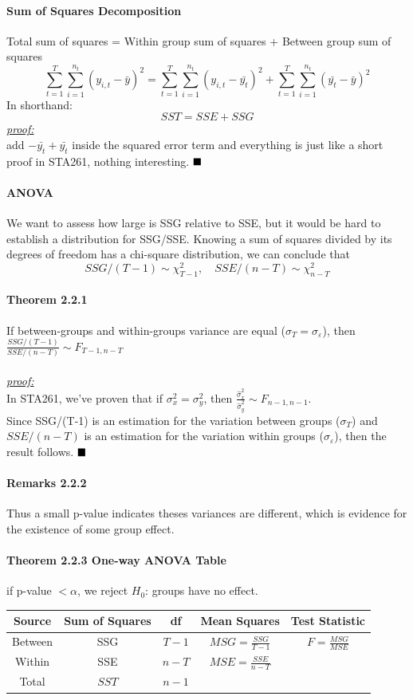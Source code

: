 \documentclass[11pt]{article}
\newcommand{\proof}[0]{\textit{\underline{proof:} }}
\newcommand{\qed}[0]{$\hfill\blacksquare$}
\begin{document}
\paragraph{Sum of Squares Decomposition}
Total sum of squares = Within group sum of squares + Between group sum of squares \\
$$\sum_{t=1}^T\sum_{i=1}^{n_t}(y_{i,t}-\bar{y})^2 = \sum_{t=1}^T\sum_{i=1}^{n_t}(y_{i,t}-\bar{y_t})^2 + \sum_{t=1}^T\sum_{i=1}^{n_t}(\bar{y_t}-\bar{y})^2$$
In shorthand:
$$SST = SSE + SSG$$
\proof\\
add $-\bar{y_t}+\bar{y_t}$ inside the squared error term and everything is just like a short proof in STA261, nothing interesting. \qed
\paragraph{ANOVA}
We want to assess how large is SSG relative to SSE, but it would be hard to establish a distribution for SSG/SSE. Knowing a sum of squares divided by its degrees of freedom has a chi-square distribution, we can conclude that
$$SSG/(T-1) \sim \chi_{T-1}^2, \quad SSE/(n-T) \sim \chi_{n-T}^2$$
\paragraph{Theorem 2.2.1} If between-groups and within-groups variance are equal ($\sigma_T = \sigma_\varepsilon$), then $\frac{SSG/(T-1)}{SSE/(n-T)} \sim F_{T-1, n-T}$ \\\\
\proof \\
In STA261, we've proven that if $\sigma_x^2 = \sigma_y^2$, then $\frac{\hat{\sigma}_x^2}{\hat{\sigma}_y^2} \sim F_{n-1,n-1}$.\\ Since SSG/(T-1) is an estimation for the variation between groups ($\sigma_T$) and $SSE/(n-T)$ is an estimation for the variation within groups ($\sigma_\varepsilon$), then the result follows. \qed
\paragraph{Remarks 2.2.2} Thus a small p-value indicates theses variances are different, which is evidence for the existence of some group effect.
\paragraph{Theorem 2.2.3 One-way ANOVA Table} if p-value $< \alpha$, we reject $H_0$: groups have no effect. \\
	\begin{tabular}{|c|c|c|c|c|}
		\hline
		Source & Sum of Squares & df & Mean Squares & Test Statistic \\
		\hline
		Between & SSG & $T-1$ & $MSG = \frac{SSG}{T-1}$ & $F = \frac{MSG}{MSE}$ \\
		\hline
		Within & SSE & $n - T$ & $MSE = \frac{SSE}{n - T}$ &\\
		\hline
		Total & $SST$ & $ n -1$ &&\\
		\hline
	\end{tabular}
\end{document}
